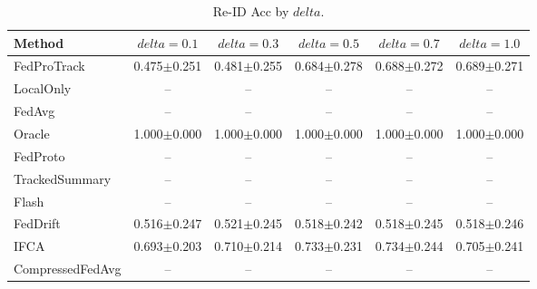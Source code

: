 \begin{table}[t]
\centering
\caption{Re-ID Acc by $delta$.}
\label{tab:delta_concept_re_id_accuracy}
\begin{tabular}{lccccc}
\toprule
Method & $delta=0.1$ & $delta=0.3$ & $delta=0.5$ & $delta=0.7$ & $delta=1.0$ \\
\midrule
FedProTrack & 0.475$\pm$0.251 & 0.481$\pm$0.255 & 0.684$\pm$0.278 & 0.688$\pm$0.272 & 0.689$\pm$0.271 \\
LocalOnly & -- & -- & -- & -- & -- \\
FedAvg & -- & -- & -- & -- & -- \\
Oracle & 1.000$\pm$0.000 & 1.000$\pm$0.000 & 1.000$\pm$0.000 & 1.000$\pm$0.000 & 1.000$\pm$0.000 \\
FedProto & -- & -- & -- & -- & -- \\
TrackedSummary & -- & -- & -- & -- & -- \\
Flash & -- & -- & -- & -- & -- \\
FedDrift & 0.516$\pm$0.247 & 0.521$\pm$0.245 & 0.518$\pm$0.242 & 0.518$\pm$0.245 & 0.518$\pm$0.246 \\
IFCA & 0.693$\pm$0.203 & 0.710$\pm$0.214 & 0.733$\pm$0.231 & 0.734$\pm$0.244 & 0.705$\pm$0.241 \\
CompressedFedAvg & -- & -- & -- & -- & -- \\
\bottomrule
\end{tabular}
\end{table}
